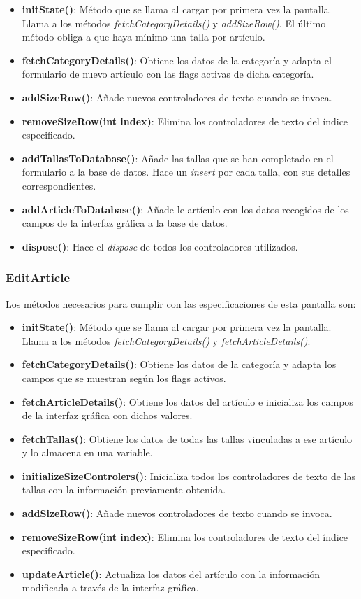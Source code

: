 \begin{itemize}
	\item \textbf{initState()}: Método que se llama al cargar por primera vez la pantalla. Llama a los métodos \textit{fetchCategoryDetails()} y \textit{addSizeRow()}. El último método obliga a que haya mínimo una talla por artículo.  
	\item \textbf{fetchCategoryDetails()}: Obtiene los datos de la categoría y adapta el formulario de nuevo artículo con las flags activas de dicha categoría. 
	\item \textbf{addSizeRow()}: Añade nuevos controladores de texto cuando se invoca. 
	\item \textbf{removeSizeRow(int index)}: Elimina los controladores de texto del índice especificado. 
	\item \textbf{addTallasToDatabase()}: Añade las tallas que se han completado en el formulario a la base de datos. Hace un \textit{insert} por cada talla, con sus detalles correspondientes. 
	\item \textbf{addArticleToDatabase()}: Añade le artículo con los datos recogidos de los campos de la interfaz gráfica a la base de datos. 
	\item \textbf{dispose()}: Hace el \textit{dispose} de todos los controladores utilizados. 
\end{itemize}

\subsubsection{EditArticle}

Los métodos necesarios para cumplir con las especificaciones de esta pantalla son:

\begin{itemize}
	\item \textbf{initState()}:  Método que se llama al cargar por primera vez la pantalla. Llama a los métodos \textit{fetchCategoryDetails()} y \textit{fetchArticleDetails()}. 
	\item \textbf{fetchCategoryDetails()}: Obtiene los datos de la categoría y adapta los campos que se muestran según los flags activos. 
	\item \textbf{fetchArticleDetails()}: Obtiene los datos del artículo e inicializa los campos de la interfaz gráfica con dichos valores. 
	\item \textbf{fetchTallas()}: Obtiene los datos de todas las tallas vinculadas a ese artículo y lo almacena en una variable. 
	\item \textbf{initializeSizeControlers()}: Inicializa todos los controladores de texto de las tallas con la información previamente obtenida. 
	\item \textbf{addSizeRow()}: Añade nuevos controladores de texto cuando se invoca. 
	\item \textbf{removeSizeRow(int index)}: Elimina los controladores de texto del índice especificado. 
	\item \textbf{updateArticle()}: Actualiza los datos del artículo con la información modificada a través de la interfaz gráfica. 
\end{itemize}

